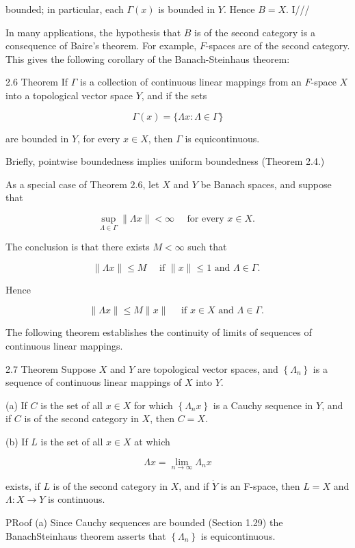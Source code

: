 \documentclass[10pt]{article}
\begin{document}
bounded; in particular, each $\Gamma(x)$ is bounded in $Y$. Hence $B=X$. I///

In many applications, the hypothesis that $B$ is of the second category is a consequence of Baire's theorem. For example, $F$-spaces are of the second category. This gives the following corollary of the Banach-Steinhaus theorem:

2.6 Theorem If $\Gamma$ is a collection of continuous linear mappings from an $F$-space $X$ into a topological vector space $Y$, and if the sets

$$
\Gamma(x)=\{\Lambda x: \Lambda \in \Gamma\}
$$

are bounded in $Y$, for every $x \in X$, then $\Gamma$ is equicontinuous.

Briefly, pointwise boundedness implies uniform boundedness (Theorem 2.4.)

As a special case of Theorem 2.6, let $X$ and $Y$ be Banach spaces, and suppose that

$$
\sup _{\Lambda \in \Gamma}\|\Lambda x\|<\infty \quad \text { for every } x \in X \text {. }
$$

The conclusion is that there exists $M<\infty$ such that

$$
\|\Lambda x\| \leq M \quad \text { if }\|x\| \leq 1 \text { and } \Lambda \in \Gamma \text {. }
$$

Hence

$$
\|\Lambda x\| \leq M\|x\| \quad \text { if } x \in X \text { and } \Lambda \in \Gamma \text {. }
$$

The following theorem establishes the continuity of limits of sequences of continuous linear mappings.

2.7 Theorem Suppose $X$ and $Y$ are topological vector spaces, and $\left\{\Lambda_{n}\right\}$ is a sequence of continuous linear mappings of $X$ into $Y$.

(a) If $C$ is the set of all $x \in X$ for which $\left\{\Lambda_{n} x\right\}$ is a Cauchy sequence in $Y$, and if $C$ is of the second category in $X$, then $C=X$.

(b) If $L$ is the set of all $x \in X$ at which

$$
\Lambda x=\lim _{n \rightarrow \infty} \Lambda_{n} x
$$

exists, if $L$ is of the second category in $X$, and if $\dot{Y}$ is an F-space, then $L=X$ and $\Lambda: X \rightarrow Y$ is continuous.

PRoof (a) Since Cauchy sequences are bounded (Section 1.29) the BanachSteinhaus theorem asserts that $\left\{\Lambda_{n}\right\}$ is equicontinuous.
\end{document}
